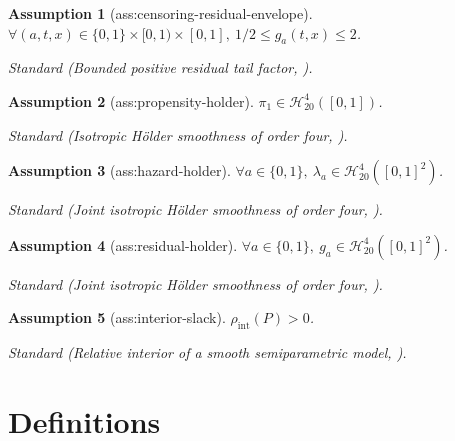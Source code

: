 \documentclass{article}
\newtheorem{assumption}{Assumption}
\begin{document}
\begin{assumption}[ass:censoring-residual-envelope]\label{ass:censoring-residual-envelope}
\(\forall(a,t,x)\in\{0,1\}\times[0,1)\times[0,1],\ 1/2\le g_a(t,x)\le2\).
\par\smallskip\noindent\emph{Standard} (Bounded positive residual tail factor, \cite{stute1995clt}).
\end{assumption}

\begin{assumption}[ass:propensity-holder]\label{ass:propensity-holder}
\(\pi_1\in\mathcal H^4_{20}([0,1])\).
\par\smallskip\noindent\emph{Standard} (Isotropic Hölder smoothness of order four, \cite{stone1982optimal}).
\end{assumption}

\begin{assumption}[ass:hazard-holder]\label{ass:hazard-holder}
\(\forall a\in\{0,1\},\ \lambda_a\in\mathcal H^4_{20}([0,1]^2)\).
\par\smallskip\noindent\emph{Standard} (Joint isotropic Hölder smoothness of order four, \cite{stone1982optimal}).
\end{assumption}

\begin{assumption}[ass:residual-holder]\label{ass:residual-holder}
\(\forall a\in\{0,1\},\ g_a\in\mathcal H^4_{20}([0,1]^2)\).
\par\smallskip\noindent\emph{Standard} (Joint isotropic Hölder smoothness of order four, \cite{stone1982optimal}).
\end{assumption}

\begin{assumption}[ass:interior-slack]\label{ass:interior-slack}
\(\rho_{\mathrm{int}}(P)>0\).
\par\smallskip\noindent\emph{Standard} (Relative interior of a smooth semiparametric model, \cite{vanderVaart1998}).
\end{assumption}

\section{Definitions}
\end{document}
